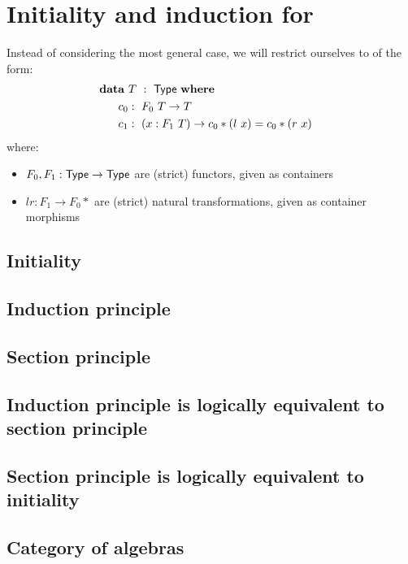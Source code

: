 \documentclass[a4paper,10pt]{article}
\begin{document}

\section{Initiality and induction for \onehits}
\label{sec:onehits}

Instead of considering the most general case, we will restrict
ourselves to \onehits of the form:
%
\begin{alignat*}{2}
  &\rlap{$\data\ T\ :\ \Type\ \where$} \\
  &&\ \ c_0  &:\ F_0\ T \to T \\
  &&\ \ c_1  &:\ (x : F_1\ T) \to c_0 * (l\ x) = c_0 * (r\ x)
\end{alignat*}
%
where:
\begin{itemize}
\item $F_0, F_1 : \mathsf{Type} \to \mathsf{Type}$ are (strict) functors, given as containers
\item $l r : F_1 \to F_0 *$ are (strict) natural transformations, given as container morphisms
\end{itemize}



\subsection{Initiality}

\subsection{Induction principle}

\subsection{Section principle}

\subsection{Induction principle is logically equivalent to section principle}

\subsection{Section principle is logically equivalent to initiality}

\subsection{Category of algebras}




\end{document}
